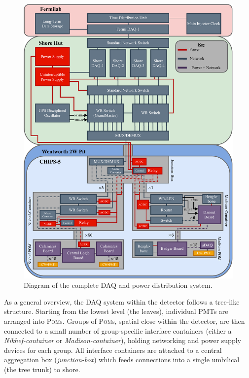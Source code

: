 \begin{figure} %
    \includegraphics[width=\textwidth]{diagrams/5-daq/daq.pdf}
    \caption[Diagram of the complete \chipsfive data acquisition and power distribution system]
    {Diagram of the complete \chipsfive DAQ and power distribution system.}
    \label{fig:daq}
\end{figure}

As a general overview, the DAQ system within the detector follows a tree-like structure. Starting
from the lowest level (the leaves), individual PMTs are arranged into \textsc{Pom}s. Groups of
\textsc{Pom}s, spatial close within the detector, are then connected to a small number of
group-specific interface containers (either a \emph{Nikhef-container} or
\emph{Madison-container}), holding networking and power supply devices for each group. All
interface containers are attached to a central aggregation box (\emph{junction-box}) which feeds
connections into a single umbilical (the tree trunk) to shore.


